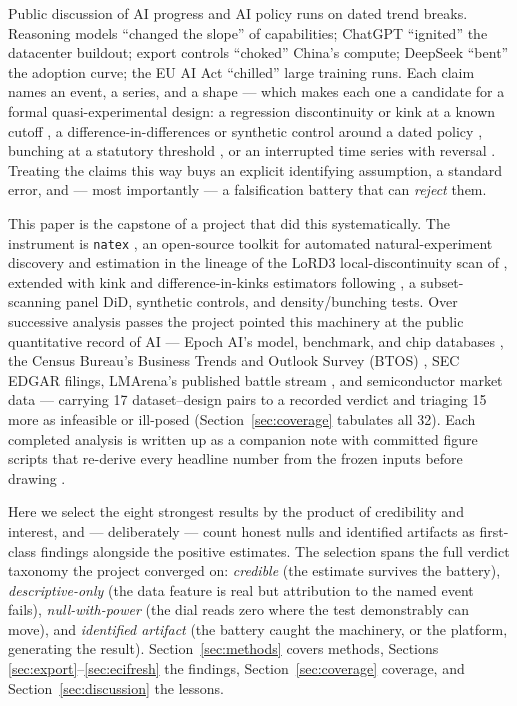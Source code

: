 \documentclass[11pt]{article}
\newcommand{\natex}{\texttt{natex}}
\begin{document}
Public discussion of AI progress and AI policy runs on dated trend breaks.
Reasoning models ``changed the slope'' of capabilities; ChatGPT ``ignited''
the datacenter buildout; export controls ``choked'' China's compute; DeepSeek
``bent'' the adoption curve; the EU AI Act ``chilled'' large training runs.
Each claim names an event, a series, and a shape --- which makes each one a
candidate for a formal quasi-experimental design: a regression discontinuity
or kink at a known cutoff \cite{card2015,hausman2018,bockerman2025}, a
difference-in-differences or synthetic control around a dated policy
\cite{abadie2010}, bunching at a statutory threshold
\cite{saez2010,klevenwaseem2013,kleven2016}, or an interrupted time series
with reversal \cite{bernal2017}. Treating the claims this way buys an
explicit identifying assumption, a standard error, and --- most importantly
--- a falsification battery that can \emph{reject} them.

This paper is the capstone of a project that did this systematically. The
instrument is \natex{} \cite{natex}, an open-source toolkit for automated
natural-experiment discovery and estimation in the lineage of the LoRD3
local-discontinuity scan of \cite{herlands2018,herlands2020,jakubowski2023},
extended with kink and
difference-in-kinks estimators following \cite{bockerman2025}, a
subset-scanning panel DiD, synthetic controls, and density/bunching tests.
Over successive analysis passes the project pointed this machinery at the
public quantitative record of AI --- Epoch AI's model, benchmark, and chip
databases \cite{epochdata,epochmodels,epochchips}, the Census Bureau's
Business Trends and Outlook Survey (BTOS) \cite{bonney2024}, SEC EDGAR
filings, LMArena's published battle stream \cite{chiang2024}, and
semiconductor market data --- carrying 17 dataset--design pairs to a
recorded verdict and triaging 15 more as infeasible or ill-posed
(Section~\ref{sec:coverage} tabulates all 32). Each completed analysis is
written up as a companion note with committed figure scripts that re-derive
every headline number from the frozen inputs before drawing
\cite{flagship,notereword,noteexport,notebtosr1,notecapex,notelmarena,noteeuact,noteeci,notechinchilla,noteprop99,notesemis}.

Here we select the eight strongest results by the product of credibility and
interest, and --- deliberately --- count honest nulls and identified
artifacts as first-class findings alongside the positive estimates. The
selection spans the full verdict taxonomy the project converged on:
\emph{credible} (the estimate survives the battery), \emph{descriptive-only}
(the data feature is real but attribution to the named event fails),
\emph{null-with-power} (the dial reads zero where the test demonstrably can
move), and \emph{identified artifact} (the battery caught the machinery, or
the platform, generating the result). Section~\ref{sec:methods} covers
methods, Sections \ref{sec:export}--\ref{sec:ecifresh} the findings,
Section~\ref{sec:coverage} coverage, and Section~\ref{sec:discussion} the
lessons.
\end{document}
